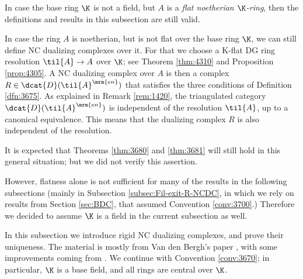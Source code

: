 \begin{rem} \label{rem:3691}
In case the base ring $\K$ is not a field, but $A$ is a {\em flat noetherian 
$\K$-ring}, then the definitions and results in this subsection are 
still valid. 

In case the ring $A$ is noetherian, but is not flat over the base ring $\K$, we 
can still define NC dualizing complexes over it. For that we choose a 
K-flat DG ring resolution $\til{A} \to A$ over $\K$; see 
Theorem \ref{thm:4310} and Proposition \ref{prop:4305}. 
A NC dualizing complex over $A$ is then a complex
$R \in \dcat{D}(\til{A}^{\mrm{en}})$ 
that satisfies the three conditions of Definition \ref{dfn:3675}.
As explained in Remark \ref{rem:1420}, the triangulated category 
$\dcat{D}(\til{A}^{\mrm{en}})$ is independent of the resolution 
$\til{A}$, up to a canonical equivalence. This means that the dualizing complex 
$R$ is also independent of the resolution.

It is expected that Theorems \ref{thm:3680} and \ref{thm:3681} will still hold 
in this general situation; but we did not verify this assertion. 

However, flatness alone is not sufficient for many of the results 
in the following subsections (mainly in Subsection 
\ref{subsec:Fil-exit-R-NCDC}, in which we rely on results from Section 
\ref{sec:BDC}, that assumed Convention \ref{conv:3700}.) Therefore we decided 
to assume $\K$ is a field in the current subsection as well.
\end{rem}




\label{subsec:RNCDC-uniq}

In this subsection we introduce rigid NC dualizing complexes, and prove their 
uniqueness. The material is mostly from Van den Bergh's paper \cite{VdB}, with 
some improvements coming from \cite{Ye4}. 
We continue with Convention \ref{conv:3670}; in particular, $\K$ is a base 
field, and all rings are central over $\K$.

